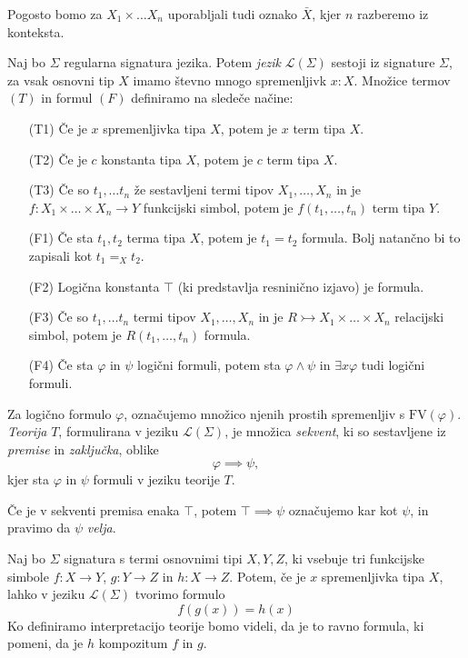 \documentclass[../kategoricna_logika.tex]{subfiles}
\begin{document}
Pogosto bomo za $X_1 \times \ldots X_n$ uporabljali tudi oznako $\bar{X}$,
kjer $n$ razberemo iz konteksta.
\begin{definicija}
  Naj bo $\Sigma$ regularna signatura jezika.
  Potem \emph{jezik} $\mathcal{L}(\Sigma)$ sestoji iz signature $\Sigma$,
  za vsak osnovni tip $X$ imamo števno mnogo spremenljivk $x:X$.
  Množice termov $(T)$ in formul $(F)$ definiramo na sledeče načine:
  \begin{itemize}
    \item [(T1)] Če je $x$ spremenljivka tipa $X$, potem je $x$ term tipa $X$.
    \item [(T2)] Če je $c$ konstanta tipa $X$, potem je $c$ term tipa $X$.
    \item [(T3)] Če so $t_1, \ldots t_n$ že sestavljeni termi tipov $X_1, \ldots, X_n$
      in je $f : X_1 \times \ldots \times X_n \to Y$ funkcijski simbol,
      potem je $f(t_1, \ldots, t_n)$ term tipa $Y$.
    \item [(F1)] Če sta $t_1, t_2$ terma tipa $X$, potem je $t_1 = t_2$ formula. Bolj natančno bi to zapisali kot $t_1 =_X t_2$.
    \item [(F2)] Logična konstanta $\top$ (ki predstavlja resninično izjavo) je formula.
    \item [(F3)] Če so $t_1, \ldots t_n$ termi tipov $X_1, \ldots, X_n$ in je $R \rightarrowtail X_1 \times \ldots \times X_n$ relacijski simbol, potem je $R(t_1, \ldots, t_n)$ formula.
    \item [(F4)] Če sta $\varphi$ in $\psi$ logični formuli, potem sta $\varphi \wedge \psi$ in $\exists x \varphi$ tudi logični formuli.
  \end{itemize}
  Za logično formulo $\varphi$,
  označujemo množico njenih prostih spremenljiv s $\mathrm{FV}(\varphi)$.
  \emph{Teorija} $T$, formulirana v jeziku $\mathcal{L}(\Sigma)$,
  je množica \emph{sekvent}, ki so sestavljene iz \emph{premise} in \emph{zaključka}, oblike 
  $$\varphi \implies \psi,$$
  kjer sta $\varphi$ in $\psi$ formuli v jeziku teorije $T$.
\end{definicija}
Če je v sekventi premisa enaka $\top$, potem $\top \implies \psi$ označujemo kar kot $\psi$,
in pravimo da $\psi$ \emph{velja}.
\begin{primer}\label{primer:kompozitum}
  Naj bo $\Sigma$ signatura s termi osnovnimi tipi $X,Y,Z$,
  ki vsebuje tri funkcijske simbole $f: X \to Y$, $g : Y \to Z$ in $h : X \to Z$.
  Potem, če je $x$ spremenljivka tipa $X$, lahko v jeziku $\mathcal{L}(\Sigma)$ tvorimo formulo
  $$f(g(x)) = h(x)$$
  Ko definiramo interpretacijo teorije bomo videli, da je to ravno formula, ki pomeni, da je $h$ kompozitum $f$ in $g$.
\end{primer}
\end{document}
